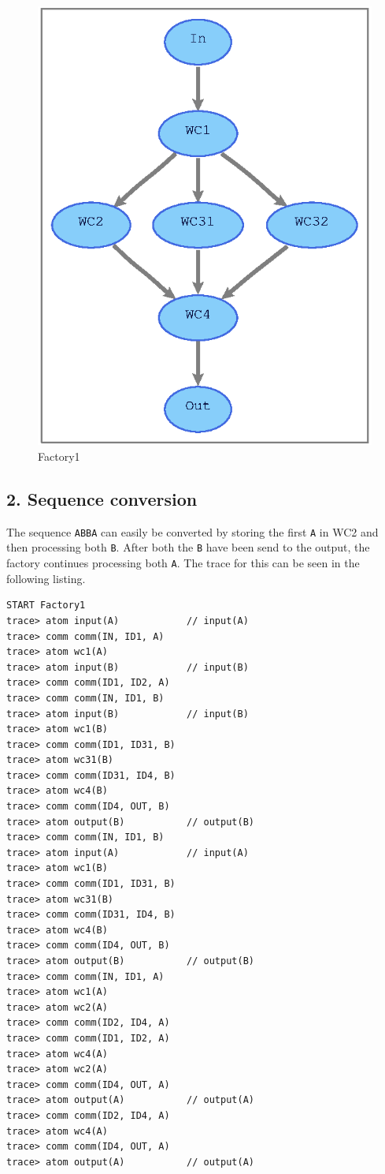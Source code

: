 \documentclass[a4paper,12px]{article}
\begin{document}
\begin{figure}[h]
    \centering
    \includegraphics[width=0.4\linewidth]{Factory1/Factory1.eps}
    \caption{Factory1}
    \label{fig:factory1}
\end{figure}
\FloatBarrier%

\subsection*{2. Sequence conversion}

The sequence \verb|ABBA| can easily be converted by storing the first \verb|A|
in WC2 and then processing both \verb|B|. After both the \verb|B| have been
send to the output, the factory continues processing both \verb|A|. The trace for this can be seen
in the following listing.

\begin{verbatim}
START Factory1
trace> atom input(A)            // input(A)
trace> comm comm(IN, ID1, A)
trace> atom wc1(A)
trace> atom input(B)            // input(B)
trace> comm comm(ID1, ID2, A)
trace> comm comm(IN, ID1, B)
trace> atom input(B)            // input(B)
trace> atom wc1(B)
trace> comm comm(ID1, ID31, B)
trace> atom wc31(B)
trace> comm comm(ID31, ID4, B)
trace> atom wc4(B)
trace> comm comm(ID4, OUT, B)
trace> atom output(B)           // output(B)
trace> comm comm(IN, ID1, B)
trace> atom input(A)            // input(A)
trace> atom wc1(B)
trace> comm comm(ID1, ID31, B)
trace> atom wc31(B)
trace> comm comm(ID31, ID4, B)
trace> atom wc4(B)
trace> comm comm(ID4, OUT, B)
trace> atom output(B)           // output(B)
trace> comm comm(IN, ID1, A)
trace> atom wc1(A)
trace> atom wc2(A)
trace> comm comm(ID2, ID4, A)
trace> comm comm(ID1, ID2, A)
trace> atom wc4(A)
trace> atom wc2(A)
trace> comm comm(ID4, OUT, A)
trace> atom output(A)           // output(A)
trace> comm comm(ID2, ID4, A)
trace> atom wc4(A)
trace> comm comm(ID4, OUT, A)
trace> atom output(A)           // output(A)
\end{verbatim}
\end{document}
